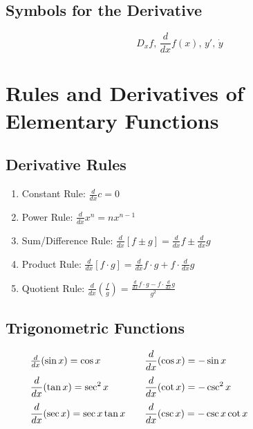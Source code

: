 \documentclass[11pt]{article}
\begin{document}
\subsection{Symbols for the Derivative}
\[
    D_xf\text{, }
    \frac{d}{dx}f(x)\text{, }
    y'\text{, }
    \dot{y}
\]

\section{Rules and Derivatives of Elementary Functions}
\subsection{Derivative Rules}
\begin{enumerate}
    \item Constant Rule:
    $\displaystyle
        \frac{d}{dx}c = 0
    $
    
    \item Power Rule:
    $\displaystyle
        \frac{d}{dx}x^n = nx^{n-1}
    $
    
    \item Sum/Difference Rule:
    $\displaystyle
        \frac{d}{dx}[f \pm g] = \frac{d}{dx}f \pm \frac{d}{dx}g
    $
    
    \item Product Rule:
    $\displaystyle
        \frac{d}{dx}[f \cdot g] = \frac{d}{dx}f \cdot g + f \cdot \frac{d}{dx}g
    $
    
    \item Quotient Rule:
    $\displaystyle
        \frac{d}{dx}\left(\frac{f}{g}\right) = \frac{\frac{d}{dx}f \cdot g - f \cdot \frac{d}{dx}g}{g^2}
    $
\end{enumerate}
\subsection{Trigonometric Functions}
$
    \begin{array}{l@{\qquad}l}
        \qquad\frac{d}{dx}(\sin x) = \cos x & \displaystyle \frac{d}{dx}(\cos x) = -\sin x \\[10pt]
        \qquad\displaystyle \frac{d}{dx}(\tan x) = \sec^2 x & \displaystyle \frac{d}{dx}(\cot x) = -\csc^2 x \\[10pt]
        \qquad\displaystyle \frac{d}{dx}(\sec x) = \sec x \tan x & \displaystyle \frac{d}{dx}(\csc x) = -\csc x \cot x \\
    \end{array}
$
\end{document}
